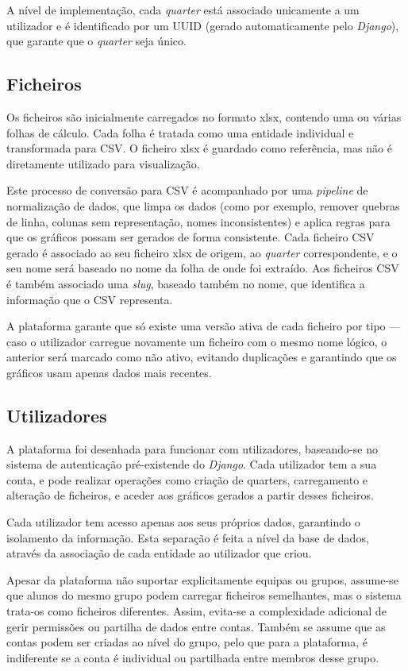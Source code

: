 A nível de implementação, cada \textit{quarter} está associado unicamente a um utilizador e é identificado por um UUID (gerado automaticamente pelo \textit{Django}), que garante que o \textit{quarter} seja único.

\subsection{Ficheiros}

Os ficheiros são inicialmente carregados no formato \gls{xlsx}, contendo uma ou várias folhas de cálculo. Cada folha é tratada como uma entidade individual e transformada para CSV. O ficheiro \gls{xlsx} é guardado como referência, mas não é diretamente utilizado para visualização.

Este processo de conversão para CSV é acompanhado por uma \textit{pipeline} de normalização de dados, que limpa os dados (como por exemplo, remover quebras de linha, colunas sem representação, nomes inconsistentes) e aplica regras para que os gráficos possam ser gerados de forma consistente. Cada ficheiro CSV gerado é associado ao seu ficheiro \gls{xlsx} de origem, ao \textit{quarter} correspondente, e o seu nome será baseado no nome da folha de onde foi extraído. Aos ficheiros CSV é também associado uma \textit{slug}, baseado também no nome, que identifica a informação que o CSV representa.

A plataforma garante que só existe uma versão ativa de cada ficheiro por tipo — caso o utilizador carregue novamente um ficheiro com o mesmo nome lógico, o anterior será marcado como não ativo, evitando duplicações e garantindo que os gráficos usam apenas dados mais recentes.

\subsection{Utilizadores}

A plataforma foi desenhada para funcionar com utilizadores, baseando-se no sistema de autenticação pré-existende do \textit{Django}. Cada utilizador tem a sua conta, e pode realizar operações como criação de quarters, carregamento e alteração de ficheiros, e aceder aos gráficos gerados a partir desses ficheiros.

Cada utilizador tem acesso apenas aos seus próprios dados, garantindo o isolamento da informação. Esta separação é feita a nível da base de dados, através da associação de cada entidade ao utilizador que criou.

Apesar da plataforma não suportar explicitamente equipas ou grupos, assume-se que alunos do mesmo grupo podem carregar ficheiros semelhantes, mas o sistema trata-os como ficheiros diferentes. Assim, evita-se a complexidade adicional de gerir permissões ou partilha de dados entre contas. Também se assume que as contas podem ser criadas ao nível do grupo, pelo que para a plataforma, é indiferente se a conta é individual ou partilhada entre membros desse grupo.

